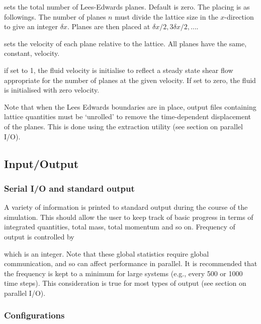 
sets the total number of Lees-Edwards planes. Default is zero.
The placing is as followings. The number of planes $n$ must
divide the lattice size in the $x$-direction to give an integer
$\delta x$. Planes are then placed at $\delta x / 2, 3\delta x/2, \ldots$.


sets the velocity of each plane relative to the lattice. All planes
have the same, constant, velocity.


if set to 1, the fluid velocity is initialise to reflect a steady
state shear flow appropriate for the number of planes at the
given velocity. If set to zero, the fluid is initialised with
zero velocity.

Note that when the Lees Edwards boundaries are in place, output
files containing lattice quantities must be `unrolled' to remove
the time-dependent displacement of the planes. This is done using
the extraction utility (see section on parallel I/O).

\subsection{Input/Output}

\subsubsection{Serial I/O and standard output}

A variety of information is printed to standard output during the
course of the simulation. This should allow the user to keep track
of basic progress in terms of integrated quantities, total mass,
total momentum and so on. Frequency of output is controlled by


which is an integer. Note that these global statistics require
global communication, and so can affect performance in parallel.
It is recommended that the frequency is kept to a minimum for
large systems (e.g., every 500 or 1000 time steps). This
consideration is true for most types of output (see section
on parallel I/O).

\subsubsection{Configurations}

